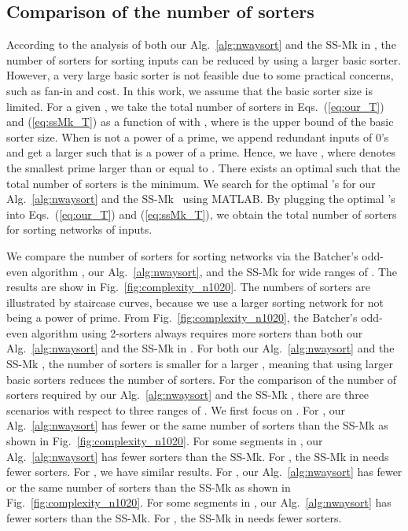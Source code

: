 \documentclass[10pt,journal,cspaper,compsoc]{IEEEtran}
\begin{document}
\subsection{Comparison of the number of sorters}
\label{sec:comp}
According to the analysis of both our Alg.~\ref{alg:nwaysort} and the SS-Mk in \cite{gao1997sloping}, the number of sorters for sorting  inputs can be reduced by using a larger basic sorter. However, a very large basic sorter is not feasible due to some practical concerns, such as fan-in and cost. In this work, we assume that the basic sorter size is limited.
For a given , we take the total number of sorters in Eqs.~(\ref{eq:our_T}) and (\ref{eq:ssMk_T}) as a function of  with , where  is the upper bound of the basic sorter size.
When  is not a power of a prime, we append redundant inputs of 0's and get a larger  such that  is a power of a prime. Hence, we have , where  denotes the smallest prime larger than or equal to .
There exists an optimal  such that the total number of sorters is the minimum.
We search for the optimal 's for our Alg.~\ref{alg:nwaysort} and the SS-Mk~\cite{gao1997sloping} using MATLAB. By plugging the optimal 's into Eqs.~(\ref{eq:our_T}) and (\ref{eq:ssMk_T}), we obtain the total number of sorters for sorting networks of  inputs.

We compare the number of sorters for sorting networks via the Batcher's odd-even algorithm \cite{Bat68sorting}, our Alg.~\ref{alg:nwaysort}, and the SS-Mk \cite{gao1997sloping} for wide ranges of . The results are show in Fig.~\ref{fig:complexity_n1020}. The numbers of sorters are illustrated by staircase curves, because we use a larger sorting network for  not being a power of prime.
From Fig.~\ref{fig:complexity_n1020}, the Batcher's odd-even algorithm using 2-sorters always requires more sorters than both our Alg.~\ref{alg:nwaysort} and the SS-Mk in \cite{gao1997sloping}.
For both our Alg.~\ref{alg:nwaysort} and the SS-Mk \cite{gao1997sloping}, the number of sorters is smaller for a larger , meaning that using larger basic sorters reduces the number of sorters.
For the comparison of the number of sorters required by our Alg.~\ref{alg:nwaysort} and the SS-Mk \cite{gao1997sloping}, there are three scenarios with respect to three ranges of . We first focus on . For , our Alg.~\ref{alg:nwaysort} has fewer or the same number of sorters than the SS-Mk as shown in Fig.~\ref{fig:complexity_n1020}. For some segments in , our Alg.~\ref{alg:nwaysort} has fewer sorters than the SS-Mk.
For , the SS-Mk in \cite{gao1997sloping} needs fewer sorters.
For , we have similar results.
For , our Alg.~\ref{alg:nwaysort} has fewer or the same number of sorters than the SS-Mk as shown in Fig.~\ref{fig:complexity_n1020}. For some segments in , our Alg.~\ref{alg:nwaysort} has fewer sorters than the SS-Mk. For , the SS-Mk in \cite{gao1997sloping} needs fewer sorters.
\end{document}
